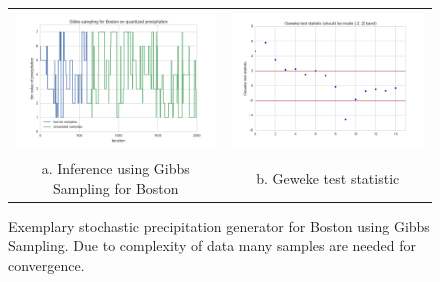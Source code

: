 \documentclass{article}
\begin{document}
\begin{figure}
\centering
\begin{tabular}{cc}
\includegraphics[scale=0.35]{../images/gibbs.png} & \includegraphics[scale=0.35]{../images/geweke.png} \\
a. Inference using Gibbs Sampling for Boston & b. Geweke test statistic
\end{tabular}
\caption{Exemplary stochastic precipitation generator for Boston using Gibbs Sampling. Due to complexity of data many samples are needed for convergence.}
\label{fig:gibbssampling}
\end{figure}
\end{document}
